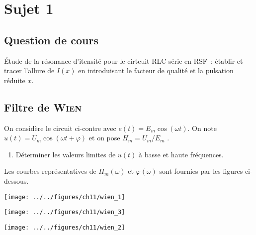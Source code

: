 \documentclass[a4paper, 11pt]{book}
\begin{document}
\chapter{Sujet 1}
\section{Question de cours}

Étude de la résonance d'itensité pour le cirtcuit RLC série en RSF~: établir et
tracer l'allure de $I(x)$ en introduisant le facteur de qualité et la pulsation
réduite $x$.

\resetQ
\section{Filtre de \textsc{Wien}}

\begin{minipage}{0.45\linewidth}
    On considère le circuit ci-contre avec $e(t) = E_m \cos(\omega t)$. On note
    $u(t) = U_m \cos(\omega t + \varphi)$ et on pose $H_m = U_m / E_m$ .
    \begin{enumerate}
        \item Déterminer les valeurs limites de $u(t)$ à basse et haute
            fréquences.
    \end{enumerate}
    Les courbes représentatives de $H_m (\omega)$ et $\varphi(\omega)$ sont
    fournies par les figures ci-dessous.
\end{minipage}
\hfill
\begin{minipage}{0.45\linewidth}
    \begin{center}
        \texttt{[image: ../../figures/ch11/wien\_1]}
    \end{center}
\end{minipage}

\begin{minipage}{0.45\linewidth}
    \begin{center}
        \texttt{[image: ../../figures/ch11/wien\_3]}
    \end{center}
\end{minipage}
\hfill
\begin{minipage}{0.45\linewidth}
    \begin{center}
        \texttt{[image: ../../figures/ch11/wien\_2]}
    \end{center}
\end{minipage}
\end{document}
